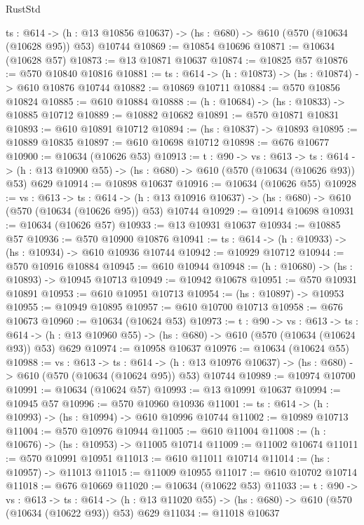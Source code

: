 \begin{lexlean}{RustStd}
\begin{coremodule}
  {ts : @614} ->
  (h : @13 @10856 @10637) -> (hs : @680) -> @610 (@570 (@10634 (@10628 @95)) @53) @10744
@10869 := @10854 @10696
@10871 := @10634 (@10628 @57)
@10873 := @13 @10871 @10637
@10874 := @10825 @57
@10876 := @570 @10840 @10816
@10881 := {ts : @614} -> (h : @10873) -> (hs : @10874) -> @610 @10876 @10744
@10882 := @10869 @10711
@10884 := @570 @10856 @10824
@10885 := @610 @10884
@10888 := (h : @10684) -> (hs : @10833) -> @10885 @10712
@10889 := @10882 @10682
@10891 := @570 @10871 @10831
@10893 := @610 @10891 @10712
@10894 := (hs : @10837) -> @10893
@10895 := @10889 @10835
@10897 := @610 @10698 @10712
@10898 := @676 @10677
@10900 := @10634 (@10626 @53)
@10913 := {t : @90} ->
  {vs : @613} ->
  {ts : @614} -> (h : @13 @10900 @55) -> (hs : @680) -> @610 (@570 (@10634 (@10626 @93)) @53) @629
@10914 := @10898 @10637
@10916 := @10634 (@10626 @55)
@10928 := {vs : @613} ->
  {ts : @614} ->
  (h : @13 @10916 @10637) -> (hs : @680) -> @610 (@570 (@10634 (@10626 @95)) @53) @10744
@10929 := @10914 @10698
@10931 := @10634 (@10626 @57)
@10933 := @13 @10931 @10637
@10934 := @10885 @57
@10936 := @570 @10900 @10876
@10941 := {ts : @614} -> (h : @10933) -> (hs : @10934) -> @610 @10936 @10744
@10942 := @10929 @10712
@10944 := @570 @10916 @10884
@10945 := @610 @10944
@10948 := (h : @10680) -> (hs : @10893) -> @10945 @10713
@10949 := @10942 @10678
@10951 := @570 @10931 @10891
@10953 := @610 @10951 @10713
@10954 := (hs : @10897) -> @10953
@10955 := @10949 @10895
@10957 := @610 @10700 @10713
@10958 := @676 @10673
@10960 := @10634 (@10624 @53)
@10973 := {t : @90} ->
  {vs : @613} ->
  {ts : @614} -> (h : @13 @10960 @55) -> (hs : @680) -> @610 (@570 (@10634 (@10624 @93)) @53) @629
@10974 := @10958 @10637
@10976 := @10634 (@10624 @55)
@10988 := {vs : @613} ->
  {ts : @614} ->
  (h : @13 @10976 @10637) -> (hs : @680) -> @610 (@570 (@10634 (@10624 @95)) @53) @10744
@10989 := @10974 @10700
@10991 := @10634 (@10624 @57)
@10993 := @13 @10991 @10637
@10994 := @10945 @57
@10996 := @570 @10960 @10936
@11001 := {ts : @614} -> (h : @10993) -> (hs : @10994) -> @610 @10996 @10744
@11002 := @10989 @10713
@11004 := @570 @10976 @10944
@11005 := @610 @11004
@11008 := (h : @10676) -> (hs : @10953) -> @11005 @10714
@11009 := @11002 @10674
@11011 := @570 @10991 @10951
@11013 := @610 @11011 @10714
@11014 := (hs : @10957) -> @11013
@11015 := @11009 @10955
@11017 := @610 @10702 @10714
@11018 := @676 @10669
@11020 := @10634 (@10622 @53)
@11033 := {t : @90} ->
  {vs : @613} ->
  {ts : @614} -> (h : @13 @11020 @55) -> (hs : @680) -> @610 (@570 (@10634 (@10622 @93)) @53) @629
@11034 := @11018 @10637

\end{coremodule}
\end{lexlean}

